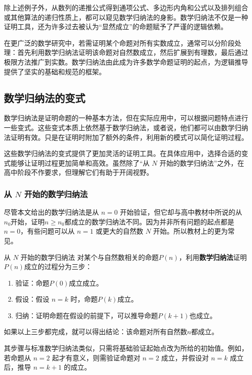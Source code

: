 除上述例子外，从数列的递推公式得到通项公式、多边形内角和公式以及排列组合或其他算法的递归性质上，都可以窥见数学归纳法的身影。数学归纳法不仅是一种证明工具，还为许多过去被认为“显然成立”的命题赋予了严谨的逻辑依赖。

在更广泛的数学研究中，若需证明某个命题对所有实数成立，通常可以分阶段处理：首先利用数学归纳法证明该命题对自然数成立，然后扩展到有理数，最后通过极限方法推广到实数。数学归纳法由此成为许多数学命题证明的起点，为逻辑推导提供了坚实的基础和规范的框架。

\subsection{数学归纳法的变式}

数学归纳法是证明命题的一种基本方法，但在实际应用中，可以根据问题特点进行一些变式。这些变式本质上依然基于数学归纳法，或者说，他们都可以由数学归纳法证明有效。只是在证明时附加了额外的条件，利用新的模式可以简化证明过程。

这些数学归纳法的变式提供了更加灵活的证明工具。在具体应用中，选择合适的变式能够让证明过程更加简单和高效。虽然除了“从 $N$ 开始的数学归纳法”之外，在高中阶段不作要求，但理解它们有助于开阔视野。

\subsubsection{从 $N$ 开始的数学归纳法}

尽管本文给出的数学归纳法是从 $n = 0$ 开始验证，但它却与高中教材中所说的从$n_0$开始，证明$n\geq n_0$都成立的数学归纳法不同。因为并非所有问题的起点都是 $n = 0$，有些问题可以从 $n = 1$ 或更大的自然数 $N$ 开始。所以教材上的更为常见。

\begin{definition}{从 $N$ 开始的数学归纳法}
对某个与自然数相关的命题$P(n)$，利用\textbf{数学归纳法}证明$P(n)$成立的过程分为三步：
\begin{enumerate}
\item 验证：命题$P(0)$成立成立。
\item 假设：假设 $n = k$ 时，命题$P(k)$成立。
\item 归纳：证明命题在假设的前提下，可以推导命题$P(k+1)$也成立。
\end{enumerate}
如果以上三步都完成，就可以得出结论：该命题对所有自然数$n$都成立。

\end{definition}

其步骤与标准数学归纳法类似，只需将基础验证起始点改为所给的初始值。例如，
若命题从 $n = 2$ 起才有意义，则需验证命题对 $n = 2$ 成立，并假设对 $n = k$ 成立后，推导 $n = k+1$ 的成立。

